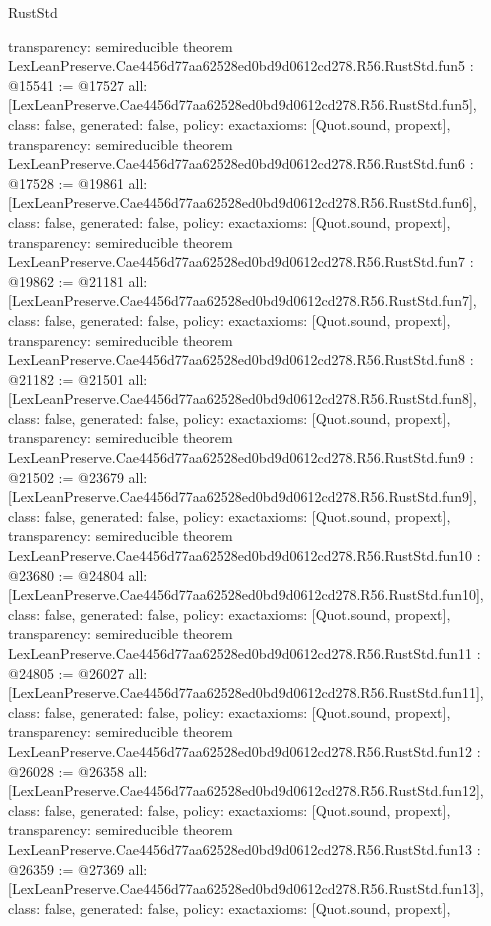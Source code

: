 \begin{lexlean}{RustStd}
\begin{coremodule}
{  transparency: semireducible
}
theorem LexLeanPreserve.Cae4456d77aa62528ed0bd9d0612cd278.R56.RustStd.fun5 : @15541 := @17527 {
  all: [LexLeanPreserve.Cae4456d77aa62528ed0bd9d0612cd278.R56.RustStd.fun5],
  class: false,
  generated: false,
  policy: exact{axioms: [Quot.sound, propext]},
  transparency: semireducible
}
theorem LexLeanPreserve.Cae4456d77aa62528ed0bd9d0612cd278.R56.RustStd.fun6 : @17528 := @19861 {
  all: [LexLeanPreserve.Cae4456d77aa62528ed0bd9d0612cd278.R56.RustStd.fun6],
  class: false,
  generated: false,
  policy: exact{axioms: [Quot.sound, propext]},
  transparency: semireducible
}
theorem LexLeanPreserve.Cae4456d77aa62528ed0bd9d0612cd278.R56.RustStd.fun7 : @19862 := @21181 {
  all: [LexLeanPreserve.Cae4456d77aa62528ed0bd9d0612cd278.R56.RustStd.fun7],
  class: false,
  generated: false,
  policy: exact{axioms: [Quot.sound, propext]},
  transparency: semireducible
}
theorem LexLeanPreserve.Cae4456d77aa62528ed0bd9d0612cd278.R56.RustStd.fun8 : @21182 := @21501 {
  all: [LexLeanPreserve.Cae4456d77aa62528ed0bd9d0612cd278.R56.RustStd.fun8],
  class: false,
  generated: false,
  policy: exact{axioms: [Quot.sound, propext]},
  transparency: semireducible
}
theorem LexLeanPreserve.Cae4456d77aa62528ed0bd9d0612cd278.R56.RustStd.fun9 : @21502 := @23679 {
  all: [LexLeanPreserve.Cae4456d77aa62528ed0bd9d0612cd278.R56.RustStd.fun9],
  class: false,
  generated: false,
  policy: exact{axioms: [Quot.sound, propext]},
  transparency: semireducible
}
theorem LexLeanPreserve.Cae4456d77aa62528ed0bd9d0612cd278.R56.RustStd.fun10 : @23680 := @24804 {
  all: [LexLeanPreserve.Cae4456d77aa62528ed0bd9d0612cd278.R56.RustStd.fun10],
  class: false,
  generated: false,
  policy: exact{axioms: [Quot.sound, propext]},
  transparency: semireducible
}
theorem LexLeanPreserve.Cae4456d77aa62528ed0bd9d0612cd278.R56.RustStd.fun11 : @24805 := @26027 {
  all: [LexLeanPreserve.Cae4456d77aa62528ed0bd9d0612cd278.R56.RustStd.fun11],
  class: false,
  generated: false,
  policy: exact{axioms: [Quot.sound, propext]},
  transparency: semireducible
}
theorem LexLeanPreserve.Cae4456d77aa62528ed0bd9d0612cd278.R56.RustStd.fun12 : @26028 := @26358 {
  all: [LexLeanPreserve.Cae4456d77aa62528ed0bd9d0612cd278.R56.RustStd.fun12],
  class: false,
  generated: false,
  policy: exact{axioms: [Quot.sound, propext]},
  transparency: semireducible
}
theorem LexLeanPreserve.Cae4456d77aa62528ed0bd9d0612cd278.R56.RustStd.fun13 : @26359 := @27369 {
  all: [LexLeanPreserve.Cae4456d77aa62528ed0bd9d0612cd278.R56.RustStd.fun13],
  class: false,
  generated: false,
  policy: exact{axioms: [Quot.sound, propext]},
}
\end{coremodule}
\end{lexlean}
